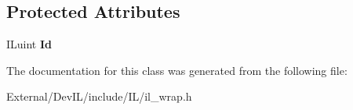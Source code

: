 \subsection*{Protected Attributes}
\begin{DoxyCompactItemize}
\item 
\hypertarget{classilImage_aa996de45b5143a4ef96b5f25026e3551}{
ILuint {\bfseries Id}}
\label{classilImage_aa996de45b5143a4ef96b5f25026e3551}

\end{DoxyCompactItemize}


The documentation for this class was generated from the following file:\begin{DoxyCompactItemize}
\item 
External/DevIL/include/IL/il\_\-wrap.h\end{DoxyCompactItemize}
